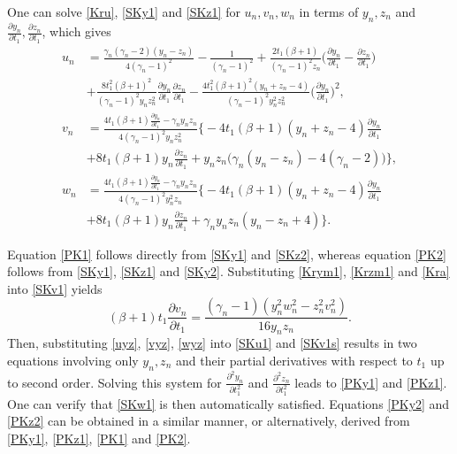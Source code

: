 \documentclass[10pt, reqno]{amsart}
\numberwithin{equation}{section}
\numberwithin{equation}{section}
\begin{document}
One can solve \eqref{Kru}, \eqref{SKy1} and \eqref{SKz1} for $u_n,v_n,w_n$ in terms of $y_n,z_n$ and $\frac{\partial y_n}{\partial t_1}, \frac{\partial z_n}{\partial t_1}$, which gives
\begin{align}
u_n&=\frac{\gamma_n(\gamma_n-2)(y_n-z_n)}{4(\gamma_n-1)^2}-\frac{1}{(\gamma_n-1)^2}+\frac{2t_1(\beta+1)}{(\gamma_n-1)^2z_n}\Big(\frac{\partial y_n}{\partial t_1}-\frac{\partial z_n}{\partial t_1}\Big)\nonumber\\
&+\frac{8t_1^2(\beta+1)^2}{(\gamma_n-1)^2y_nz_n^2}\frac{\partial y_n}{\partial t_1}\frac{\partial z_n}{\partial t_1} -\frac{4t_1^2(\beta+1)^2(y_n+z_n-4)}{(\gamma_n-1)^2y_n^2z_n^2}\Big(\frac{\partial y_n}{\partial t_1}\Big)^2,\label{uyz}\\
v_n&=\frac{4t_1(\beta+1)\frac{\partial y_n}{\partial{t_1}}-\gamma_ny_nz_n}{4(\gamma_n-1)^2y_nz_n^2}\Big\{-4t_1(\beta+1)(y_n+z_n-4)\frac{\partial y_n}{\partial t_1}\nonumber\\
&+8t_1(\beta+1)y_n\frac{\partial z_n}{\partial t_1}+y_nz_n\big(\gamma_n(y_n-z_n)-4(\gamma_n-2)\big)\Big\},\label{vyz}\\
w_n&=\frac{4t_1(\beta+1)\frac{\partial y_n}{\partial{t_1}}-\gamma_ny_nz_n}{4(\gamma_n-1)^2y_n^2z_n}\Big\{-4t_1(\beta+1)(y_n+z_n-4)\frac{\partial y_n}{\partial t_1}\nonumber\\
&+8t_1(\beta+1)y_n\frac{\partial z_n}{\partial t_1}+\gamma_ny_nz_n(y_n-z_n+4)\Big\}.\label{wyz}
\end{align}

Equation \eqref{PK1} follows directly from \eqref{SKy1} and \eqref{SKz2}, whereas equation \eqref{PK2} follows from \eqref{SKy1}, \eqref{SKz1} and \eqref{SKy2}. Substituting \eqref{Krym1}, \eqref{Krzm1} and \eqref{Kra} into \eqref{SKv1} yields
\begin{equation} \label{SKv1s}
(\beta+1)t_1\frac{\partial v_n}{\partial t_1}=\frac{(\gamma_n-1)(y_n^2w_n^2-z_n^2v_n^2)}{16 y_nz_n}.
\end{equation}
Then, substituting \eqref{uyz}, \eqref{vyz}, \eqref{wyz} into \eqref{SKu1} and \eqref{SKv1s} results in two equations involving only $y_n, z_n$ and their partial derivatives with respect to $t_1$ up to second order. Solving this system for $\frac{\partial^2 y_n}{\partial t_1^2}$ and $\frac{\partial^2 z_n}{\partial t_1^2}$ leads to \eqref{PKy1} and \eqref{PKz1}. One can verify that \eqref{SKw1} is then automatically satisfied. Equations \eqref{PKy2} and \eqref{PKz2} can be obtained in a similar manner, or alternatively, derived from \eqref{PKy1}, \eqref{PKz1}, \eqref{PK1} and \eqref{PK2}.
\end{document}
